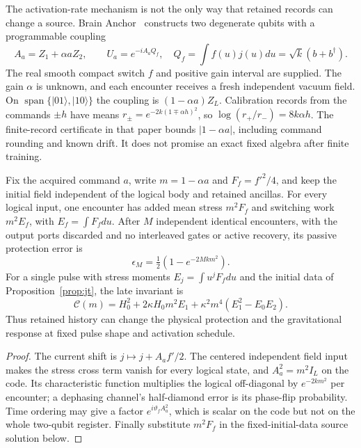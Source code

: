The activation-rate mechanism is not the only way that retained records can
change a source. Brain Anchor~\cite{BrainAnchor} constructs two degenerate
qubits with a programmable coupling
\begin{equation}
 A_a=Z_1+\alpha aZ_2,\qquad
 U_a=e^{-iA_aQ_f},\quad
 Q_f=\int f(u)j(u)du=\sqrt{k}(b+b^\dagger).
 \label{eq:protection-coupling}
\end{equation}
The real smooth compact switch $f$ and positive gain interval are supplied.
The gain $\alpha$ is unknown, and each encounter receives a fresh independent
vacuum field. On $\operatorname{span}\{|01\rangle,|10\rangle\}$ the
coupling is $(1-\alpha a)Z_L$. Calibration records from the commands $\pm h$
have means $r_\pm=e^{-2k(1\mp\alpha h)^2}$, so
$\log(r_+/r_-)=8k\alpha h$. The finite-record certificate in that paper
bounds $|1-\alpha a|$, including command rounding and known drift.
It does not promise an exact fixed algebra after finite training.

\begin{proposition}
\label{prop:protection-source}
Fix the acquired command $a$, write $m=1-\alpha a$ and
$F_f=f'^2/4$, and keep the initial field independent of the logical
body and retained ancillas. For every logical input, one encounter has
added mean stress $m^2F_f$ and switching work $m^2E_f$, with
$E_f=\int F_fdu$. After $M$ independent identical encounters, with the
output ports discarded and no interleaved gates or active recovery,
its passive protection error is
\begin{equation}
 \epsilon_M=\tfrac12(1-e^{-2Mk m^2}).
 \label{eq:protection-source-risk}
\end{equation}
For a single pulse with stress moments $E_j=\int u^jF_fdu$ and the
initial data of Proposition~\ref{prop:jt}, the late invariant is
\begin{equation}
 \mathcal C(m)=H_0^2+2\kappa H_0m^2E_1
                 +\kappa^2m^4(E_1^2-E_0E_2).
 \label{eq:protection-source-invariant}
\end{equation}
Thus retained history can change the physical protection and the
gravitational response at fixed pulse shape and activation schedule.
\end{proposition}
\begin{proof}
The current shift is $j\mapsto j+A_af'/2$. The centered independent
field input makes the stress cross term vanish for every logical state,
and $A_a^2=m^2I_L$ on the code. Its characteristic function multiplies
the logical off-diagonal by $e^{-2km^2}$ per encounter; a dephasing
channel's half-diamond error is its phase-flip probability. Time ordering
may give a factor $e^{i\vartheta_f A_a^2}$, which is scalar on the code
but not on the whole two-qubit register. Finally substitute $m^2F_f$
in the fixed-initial-data source solution below.
\end{proof}

